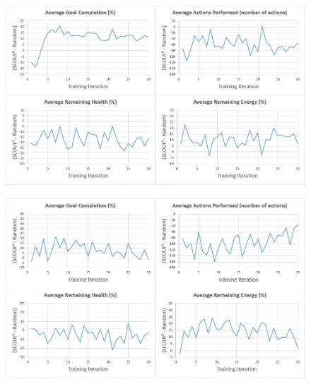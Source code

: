 \begin{appxfig}[H]
\begin{figure}[H]
  \includegraphics[width=0.9\columnwidth]{Figures/Results/TrainingVariation2/MapWater.JPG}
\end{figure}
\caption{Iteration testing performance results for $SCOUt_{MW}$ attempting \textit{Map Water} using setup variation 2 (see subsection~\ref{subsec:training_variations}). All graphs show the controller's average difference in performance compared to $Random$ ($SCOUt_{MW}$ average - $Random$ average) VS the number of training iterations completed.}
\label{appendix:mapwater_training_variation2}
\end{appxfig}


\begin{appxfig}[H]
\begin{figure}[H]
  \includegraphics[width=0.9\columnwidth]{Figures/Results/TrainingVariation2/Hybrid-FindHuman.JPG}
\end{figure}
\caption{Iteration testing performance results for $SCOUt_{H}$ attempting \textit{Find Human} using setup variation 2 (see subsection~\ref{subsec:training_variations}). All graphs show the controller's average difference in performance compared to $Random$ ($SCOUt_{H}$ average - $Random$ average) VS the number of training iterations completed.}
\label{appendix:hybrid_training_fh_variation2}
\end{appxfig}


